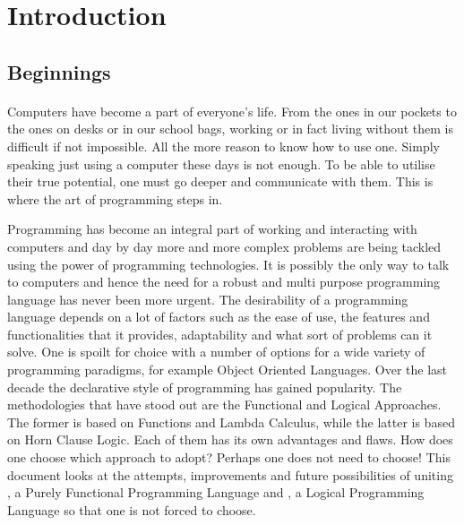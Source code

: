 \documentclass[proposal.tex]{subfiles}
\begin{document}
\section{Introduction}\label{sect:introduction}
\subsection{Beginnings}
\paragraph{}
Computers have become a part of everyone's life. From the ones in our pockets to the ones on desks or in our school bags, working or in fact living without 
them is difficult if not impossible. All the more reason to know how to use one. Simply speaking just using a computer these days is not enough. To be able 
to utilise their true potential, one must go deeper and communicate with them. This is where the art of programming steps in.     

\par Programming has become an integral part of working and interacting with computers and day by day more and more complex problems are being 
tackled using the power of programming technologies. It is possibly the only way to talk to computers and hence the need for a robust and multi purpose 
programming language has never been more urgent. The desirability of a programming language depends on a lot of factors such as the ease of use, the 
features and functionalities that it provides, adaptability and what sort of problems can it solve. One is  spoilt for choice with a number of options for a 
wide variety of programming paradigms, for example Object Oriented Languages. Over the last decade the declarative style of programming has gained 
popularity. The methodologies that have stood out are the Functional and Logical Approaches. The former is based on Functions and Lambda Calculus, 
while the latter is based on Horn Clause Logic. Each of them has its own advantages and ﬂaws. How does one choose which approach to adopt? Perhaps
one does not need to choose! This document looks at the attempts, improvements and future possibilities of uniting , a Purely 
Functional Programming Language and , a Logical Programming Language so that one is not forced to choose.
\end{document}
